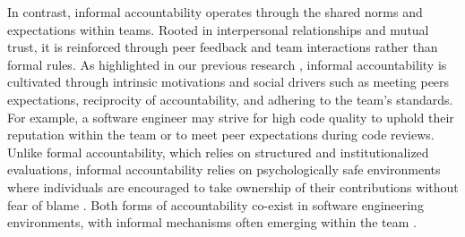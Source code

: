 In contrast, informal accountability operates through the shared norms and expectations within teams. Rooted in interpersonal relationships and mutual trust, it is reinforced through peer feedback and team interactions rather than formal rules. As highlighted in our previous research \citep{alami2024understanding}, informal accountability is cultivated through intrinsic motivations and social drivers such as meeting peers expectations, reciprocity of accountability, and adhering to the team's standards. For example, a software engineer may strive for high code quality to uphold their reputation within the team or to meet peer expectations during code reviews. Unlike formal accountability, which relies on structured and institutionalized evaluations, informal accountability relies on psychologically safe environments where individuals are encouraged to take ownership of their contributions without fear of blame \citep{alami2024understanding}. Both forms of accountability co-exist in software engineering environments, with informal mechanisms often emerging within the team \citep{alami2024understanding}.

